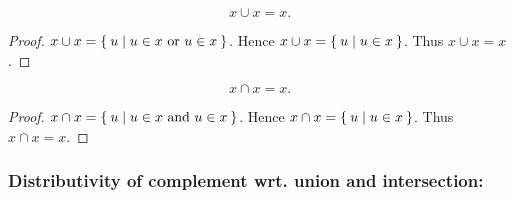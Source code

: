 \documentclass[../../set-theory.tex]{subfiles}
\begin{document}
  \begin{forthel}
    \begin{proposition}\label{SetTheory_01_01_496190}
      \[ x \cup x = x. \]
    \end{proposition}
    \begin{proof}
      $x \cup x = \Set{u | \text{$u \in x$ or $u \in x$}}$.
      Hence $x \cup x = \Set{u | u \in x}$.
      Thus $x \cup x = x$.
    \end{proof}

    \begin{proposition}\label{SetTheory_01_01_783425}
      \[ x \cap x = x. \]
    \end{proposition}
    \begin{proof}
      $x \cap x = \Set{u | \text{$u \in x$ and $u \in x$}}$.
      Hence $x \cap x = \Set{u | u \in x}$.
      Thus $x \cap x = x$.
    \end{proof}
  \end{forthel}


  \subsubsection*{Distributivity of complement wrt. union and intersection:}
\end{document}
